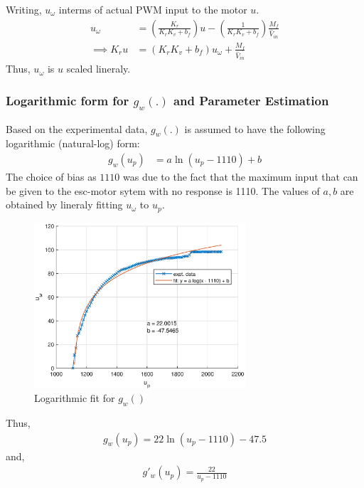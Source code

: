 Writing, $u_{\omega}$ interms of actual PWM input to the motor $u$.
\begin{align*}
    u_{\omega} &= \left(\frac{K_r}{K_r K_v  + b_f} \right) u - \left(\frac{1}{K_r K_v  + b_f} \right) \frac{M_f}{\hat V_{in}}\\
    \implies K_r u &= (K_r K_v  + b_f) u_\omega + \frac{M_f}{\hat V_{in}}
\end{align*}
Thus, $u_{\omega}$ is $u$ scaled lineraly.

\subsubsection{Logarithmic form for $g_w(.)$ and Parameter Estimation}

Based on the experimental data, $g_w(.)$ is assumed to have the following logarithmic (natural-log) form:
\begin{align*}
    g_w(u_p) &= a \ln(u_p - 1110) + b
\end{align*}
The choice of bias as $1110$ was due to the fact that the maximum input that can be given to the esc-motor sytem with no response is 1110. The values of $a, b$ are obtained by lineraly fitting $u_\omega$ to $u_p$.

\begin{figure}[H]
    \centering
    \includegraphics[width = 0.7\textwidth]{./figs/norm_omega/g_w.eps}
    \caption{Logarithmic fit for $g_w()$}
\end{figure}
Thus,
\begin{align*}
    \boxed{g_w(u_p) = 22 \ln(u_p - 1110)- 47.5 }
\end{align*}
and,
\begin{align*}
    g'_w(u_p) = \frac{22}{u_p - 1110}
\end{align*}
